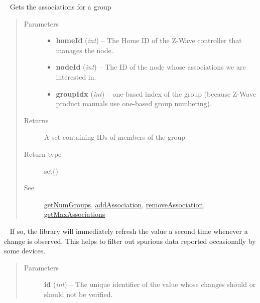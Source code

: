 \documentclass[letterpaper,10pt,english]{sphinxmanual}
\begin{document}
\begin{fulllineitems}
\begin{fulllineitems}
\begin{quote}
\begin{description}
\end{description}\end{quote}

\end{fulllineitems}


\begin{fulllineitems}
\label{libopenzwave:libopenzwave.PyManager.getAssociations}~\label{libopenzwave:getassociations}
Gets the associations for a group
\begin{quote}\begin{description}
\item[{Parameters}] \leavevmode\begin{itemize}
\item {} 
\textbf{homeId} (\emph{int}) -- The Home ID of the Z-Wave controller that manages the node.

\item {} 
\textbf{nodeId} (\emph{int}) -- The ID of the node whose associations we are interested in.

\item {} 
\textbf{groupIdx} (\emph{int}) -- one-based index of the group (because Z-Wave product manuals use one-based group numbering).

\end{itemize}

\item[{Returns}] \leavevmode
A set containing IDs of members of the group

\item[{Return type}] \leavevmode
set()

\item[{See}] \leavevmode
{\hyperref[libopenzwave:getnumgroups]{getNumGroups}}, {\hyperref[libopenzwave:addassociation]{addAssociation}}, {\hyperref[libopenzwave:removeassociation]{removeAssociation}}, {\hyperref[libopenzwave:getmaxassociations]{getMaxAssociations}}

\end{description}\end{quote}

\end{fulllineitems}


\begin{fulllineitems}
\label{libopenzwave:libopenzwave.PyManager.getChangeVerified}~
If so, the library will immediately refresh the value a second time whenever a change is observed.
This helps to filter out spurious data reported occasionally by some devices.
\begin{quote}\begin{description}
\item[{Parameters}] \leavevmode
\textbf{id} (\emph{int}) -- The unique identifier of the value whose changes should or should not be verified.


\end{description}
\end{quote}
\end{fulllineitems}
\end{fulllineitems}
\end{document}
